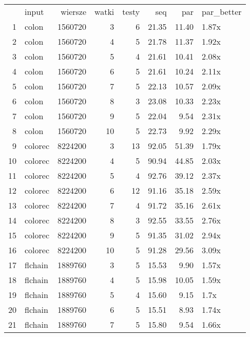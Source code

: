 \begin{table}[ht]
\centering
\begin{tabular}{rlrrrrrl}
  & input & wiersze & watki & testy & seq & par & par\_better \\ 
 1 & colon & 1560720 &   3 &   6 & 21.35 & 11.40 & 1.87x \\ 
   \hline
2 & colon & 1560720 &   4 &   5 & 21.78 & 11.37 & 1.92x \\ 
   \hline
3 & colon & 1560720 &   5 &   4 & 21.61 & 10.41 & 2.08x \\ 
   \hline
4 & colon & 1560720 &   6 &   5 & 21.61 & 10.24 & 2.11x \\ 
   \hline
5 & colon & 1560720 &   7 &   5 & 22.13 & 10.57 & 2.09x \\ 
   \hline
6 & colon & 1560720 &   8 &   3 & 23.08 & 10.33 & 2.23x \\ 
   \hline
7 & colon & 1560720 &   9 &   5 & 22.04 & 9.54 & 2.31x \\ 
   \hline
8 & colon & 1560720 &  10 &   5 & 22.73 & 9.92 & 2.29x \\ 
   \hline
9 & colorec & 8224200 &   3 &  13 & 92.05 & 51.39 & 1.79x \\ 
   \hline
10 & colorec & 8224200 &   4 &   5 & 90.94 & 44.85 & 2.03x \\ 
   \hline
11 & colorec & 8224200 &   5 &   4 & 92.76 & 39.12 & 2.37x \\ 
   \hline
12 & colorec & 8224200 &   6 &  12 & 91.16 & 35.18 & 2.59x \\ 
   \hline
13 & colorec & 8224200 &   7 &   4 & 91.72 & 35.16 & 2.61x \\ 
   \hline
14 & colorec & 8224200 &   8 &   3 & 92.55 & 33.55 & 2.76x \\ 
   \hline
15 & colorec & 8224200 &   9 &   5 & 91.35 & 31.02 & 2.94x \\ 
   \hline
16 & colorec & 8224200 &  10 &   5 & 91.28 & 29.56 & 3.09x \\ 
   \hline
17 & flchain & 1889760 &   3 &   5 & 15.53 & 9.90 & 1.57x \\ 
   \hline
18 & flchain & 1889760 &   4 &   5 & 15.98 & 10.05 & 1.59x \\ 
   \hline
19 & flchain & 1889760 &   5 &   4 & 15.60 & 9.15 & 1.7x \\ 
   \hline
20 & flchain & 1889760 &   6 &   5 & 15.51 & 8.93 & 1.74x \\ 
   \hline
21 & flchain & 1889760 &   7 &   5 & 15.80 & 9.54 & 1.66x \\ 

\end{tabular}
\end{table}
